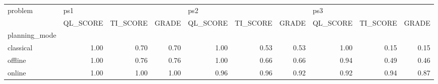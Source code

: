 \begin{tabular}{lrrrrrrrrr}
\toprule
problem & \multicolumn{3}{l}{ps1} & \multicolumn{3}{l}{ps2} & \multicolumn{3}{l}{ps3} \\
{} & QL\_SCORE & TI\_SCORE & GRADE & QL\_SCORE & TI\_SCORE & GRADE & QL\_SCORE & TI\_SCORE & GRADE \\
planning\_mode &          &          &       &          &          &       &          &          &       \\
\midrule
classical     &     1.00 &     0.70 &  0.70 &     1.00 &     0.53 &  0.53 &     1.00 &     0.15 &  0.15 \\
offline       &     1.00 &     0.76 &  0.76 &     1.00 &     0.66 &  0.66 &     0.94 &     0.49 &  0.46 \\
online        &     1.00 &     1.00 &  1.00 &     0.96 &     0.96 &  0.92 &     0.92 &     0.94 &  0.87 \\
\bottomrule
\end{tabular}
